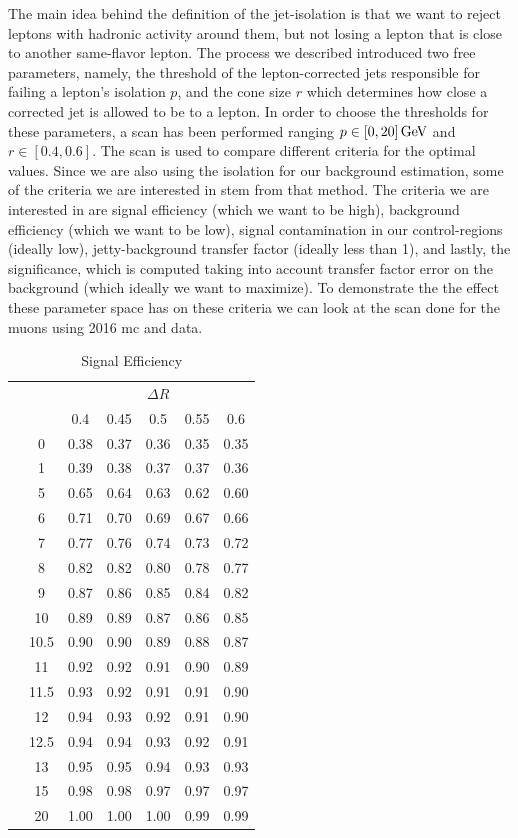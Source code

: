 The main idea behind the definition of the jet-isolation is that we want to reject leptons with hadronic activity around them, but not losing a lepton that is close to another same-flavor lepton. The process we described introduced two free parameters, namely, the \pt threshold of the lepton-corrected jets responsible for failing a lepton's isolation $p$, and the cone size $r$ which determines how close a corrected jet is allowed to be to a lepton. In order to choose the thresholds for these parameters, a scan has been performed ranging $p\in [0,20]\,\text{Ge\hspace{-.08em}V}$ and $r\in[0.4,0.6]$. The scan is used to compare different criteria for the optimal values. Since we are also using the isolation for our background estimation, some of the criteria we are interested in stem from that method. The criteria we are interested in are signal efficiency (which we want to be high), background efficiency (which we want to be low), signal contamination in our control-regions (ideally low), jetty-background transfer factor (ideally less than 1), and lastly, the significance, which is computed taking into account transfer factor error on the background (which ideally we want to maximize). To demonstrate the the effect these parameter space has on these criteria we can look at the scan done for the muons using 2016 \gls{mc} and data.

\begin{table}[!htb]
	\centering
	\label{tab:iso-scan-signal-efficiency}
		\caption{Signal Efficiency}
			\begin{tabular}{cc|ccccc}
    			&\multicolumn{1}{c}{} & \multicolumn{5}{c}{$\Delta R$} \\
    && 0.4 & 0.45 & 0.5 & 0.55 & 0.6 \\
    \cline{2-7}
    & 0 & 0.38 & 0.37 & 0.36 & 0.35 & 0.35 \\
& 1 & 0.39 & 0.38 & 0.37 & 0.37 & 0.36 \\
& 5 & 0.65 & 0.64 & 0.63 & 0.62 & 0.60 \\
& 6 & 0.71 & 0.70 & 0.69 & 0.67 & 0.66 \\
& 7 & 0.77 & 0.76 & 0.74 & 0.73 & 0.72 \\
& 8 & 0.82 & 0.82 & 0.80 & 0.78 & 0.77 \\
\smash{\rotatebox[origin=c]{90}{\pt}} & 9 & 0.87 & 0.86 & 0.85 & 0.84 & 0.82 \\
& 10 & 0.89 & 0.89 & 0.87 & 0.86 & 0.85 \\
& 10.5 & 0.90 & 0.90 & 0.89 & 0.88 & 0.87 \\
& 11 & 0.92 & 0.92 & 0.91 & 0.90 & 0.89 \\
& 11.5 & 0.93 & 0.92 & 0.91 & 0.91 & 0.90 \\
& 12 & 0.94 & 0.93 & 0.92 & 0.91 & 0.90 \\
& 12.5 & 0.94 & 0.94 & 0.93 & 0.92 & 0.91 \\
& 13 & 0.95 & 0.95 & 0.94 & 0.93 & 0.93 \\
& 15 & 0.98 & 0.98 & 0.97 & 0.97 & 0.97 \\
& 20 & 1.00 & 1.00 & 1.00 & 0.99 & 0.99
  \end{tabular}
\end{table}


